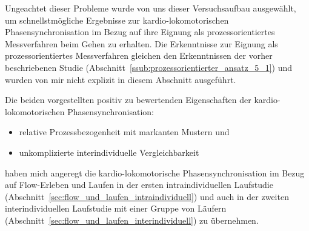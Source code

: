Ungeachtet dieser Probleme wurde von uns dieser Versuchsaufbau ausgewählt, um schnellstmögliche Ergebnisse zur kardio-lokomotorischen Phasensynchronisation im Bezug auf ihre Eignung als prozessorientiertes Messverfahren beim Gehen zu erhalten. Die Erkenntnisse zur Eignung als prozessorientiertes Messverfahren gleichen den Erkenntnissen der vorher beschriebenen Studie (Abschnitt~\ref{ssub:prozessorientierter_ansatz_5_1}) und wurden von mir nicht explizit in diesem Abschnitt ausgeführt.

Die beiden vorgestellten positiv zu bewertenden Eigenschaften der kardio-lokomotorischen Phasensynchronisation: 
\begin{itemize}
	
	\item relative Prozessbezogenheit mit markanten Mustern und
	
	\item unkomplizierte interindividuelle Vergleichbarkeit 
\end{itemize}

haben mich angeregt die kardio-lokomotorische Phasensynchronisation im Bezug auf Flow-Erleben und Laufen in der ersten intraindividuellen Laufstudie (Abschnitt~\ref{sec:flow_und_laufen_intraindividuell}) und auch in der zweiten interindividuellen Laufstudie mit einer Gruppe von Läufern (Abschnitt~\ref{sec:flow_und_laufen_interindividuell}) zu übernehmen.

